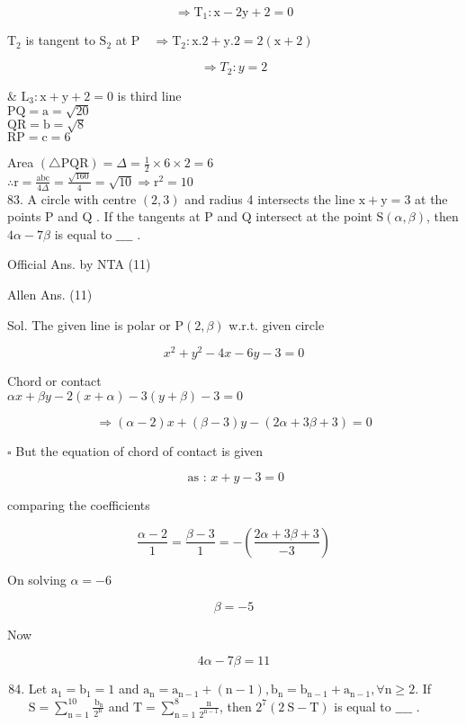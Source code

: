 \documentclass[10pt]{article}
\begin{document}
\[
\Rightarrow \mathrm{T}_{1}: \mathrm{x}-2 \mathrm{y}+2=0
\]

\(\mathrm{T}_{2}\) is tangent to \(\mathrm{S}_{2}\) at \(\mathrm{P} \quad \Rightarrow \mathrm{T}_{2}: \mathrm{x} .2+\mathrm{y} .2=2(\mathrm{x}+2)\)

\[
\Rightarrow T_{2}: y=2
\]

\& \(\mathrm{L}_{3}: \mathrm{x}+\mathrm{y}+2=0\) is third line\\
\(\mathrm{PQ}=\mathrm{a}=\sqrt{20}\)\\
\(\mathrm{QR}=\mathrm{b}=\sqrt{8}\)\\
\(\mathrm{RP}=\mathrm{c}=6\)

Area \((\triangle \mathrm{PQR})=\Delta=\frac{1}{2} \times 6 \times 2=6\)\\
\(\therefore \mathrm{r}=\frac{\mathrm{abc}}{4 \Delta}=\frac{\sqrt{160}}{4}=\sqrt{10} \Rightarrow \mathrm{r}^{2}=10\)\\
83. A circle with centre \((2,3)\) and radius 4 intersects the line \(\mathrm{x}+\mathrm{y}=3\) at the points P and Q . If the tangents at P and Q intersect at the point \(\mathrm{S}(\alpha, \beta)\), then \(4 \alpha-7 \beta\) is equal to \(\_\_\_\_\) .

Official Ans. by NTA (11)

Allen Ans. (11)

Sol. The given line is polar or \(\mathrm{P}(2, \beta)\) w.r.t. given circle

\[
x^{2}+y^{2}-4 x-6 y-3=0
\]

Chord or contact\\
\(\alpha x+\beta y-2(x+\alpha)-3(y+\beta)-3=0\)

\[
\Rightarrow(\alpha-2) x+(\beta-3) y-(2 \alpha+3 \beta+3)=0
\]

\(\square\) But the equation of chord of contact is given

\[
\text { as : } x+y-3=0
\]

comparing the coefficients

\[
\frac{\alpha-2}{1}=\frac{\beta-3}{1}=-\left(\frac{2 \alpha+3 \beta+3}{-3}\right)
\]

On solving \(\alpha=-6\)

\[
\beta=-5
\]

Now

\[
4 \alpha-7 \beta=11
\]

\begin{enumerate}
  \setcounter{enumi}{83}
  \item Let \(\mathrm{a}_{1}=\mathrm{b}_{1}=1\) and \(\mathrm{a}_{\mathrm{n}}=\mathrm{a}_{\mathrm{n}-1}+(\mathrm{n}-1), \mathrm{b}_{\mathrm{n}}=\mathrm{b}_{\mathrm{n}-1}+ \mathrm{a}_{\mathrm{n}-1}, \forall \mathrm{n} \geq 2\). If \(\mathrm{S}=\sum_{\mathrm{n}=1}^{10} \frac{\mathrm{~b}_{\mathrm{n}}}{2^{\mathrm{n}}}\) and \(\mathrm{T}=\sum_{\mathrm{n}=1}^{8} \frac{\mathrm{n}}{2^{\mathrm{n}-1}}\), then \(2^{7}(2 \mathrm{~S}-\mathrm{T})\) is equal to \(\_\_\_\_\) .
\end{enumerate}
\end{document}
